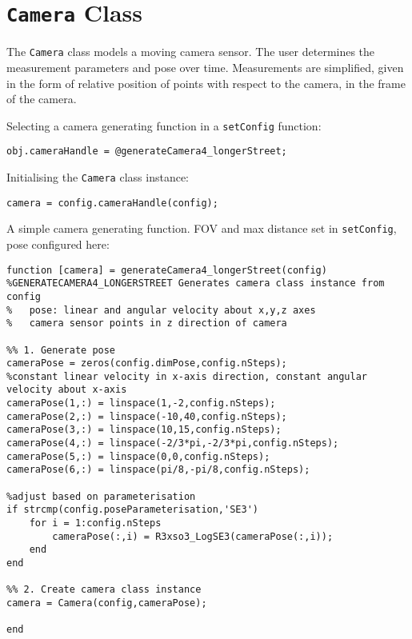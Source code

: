 \section{\texttt{Camera} Class}
The \texttt{Camera} class models a moving camera sensor. The user determines the measurement parameters and pose over time.
Measurements are simplified, given in the form of relative position of points with respect to the camera, in the frame of the camera.

Selecting a camera generating function in a \texttt{setConfig} function:
\begin{lstlisting}
obj.cameraHandle = @generateCamera4_longerStreet;
\end{lstlisting}

Initialising the \texttt{Camera} class instance:
\begin{lstlisting}
camera = config.cameraHandle(config);
\end{lstlisting}

A simple camera generating function. FOV and max distance set in \texttt{setConfig}, pose configured here:
\begin{lstlisting}
function [camera] = generateCamera4_longerStreet(config)
%GENERATECAMERA4_LONGERSTREET Generates camera class instance from config
%   pose: linear and angular velocity about x,y,z axes
%   camera sensor points in z direction of camera

%% 1. Generate pose
cameraPose = zeros(config.dimPose,config.nSteps);
%constant linear velocity in x-axis direction, constant angular velocity about x-axis
cameraPose(1,:) = linspace(1,-2,config.nSteps);
cameraPose(2,:) = linspace(-10,40,config.nSteps);
cameraPose(3,:) = linspace(10,15,config.nSteps);
cameraPose(4,:) = linspace(-2/3*pi,-2/3*pi,config.nSteps);
cameraPose(5,:) = linspace(0,0,config.nSteps);
cameraPose(6,:) = linspace(pi/8,-pi/8,config.nSteps);

%adjust based on parameterisation
if strcmp(config.poseParameterisation,'SE3')
    for i = 1:config.nSteps
        cameraPose(:,i) = R3xso3_LogSE3(cameraPose(:,i));
    end
end

%% 2. Create camera class instance
camera = Camera(config,cameraPose);

end
\end{lstlisting}
